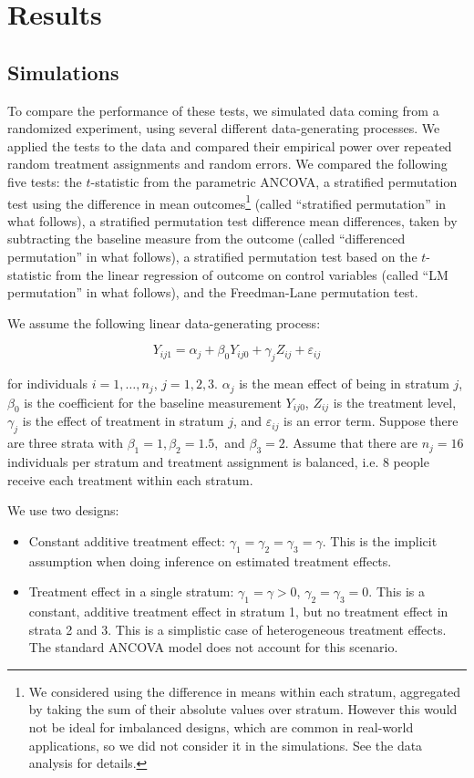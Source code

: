 \documentclass[11pt]{article}
\begin{document}
\section{Results}
\subsection{Simulations}

To compare the performance of these tests, we simulated data coming from a randomized experiment, using several different data-generating processes.
We applied the tests to the data and compared their empirical power over repeated random treatment assignments and random errors.
We compared the following five tests:
the $t$-statistic from the parametric ANCOVA,
a stratified permutation test using the difference in mean outcomes\footnote{ We considered using the difference in means within each stratum, aggregated by taking the sum of their absolute values over stratum. However this would not be ideal for imbalanced designs, which are common in real-world applications, so we did not consider it in the simulations.  See the data analysis for details.}
 (called ``stratified permutation'' in what follows),
a stratified permutation test difference mean differences, taken by subtracting the baseline measure from the outcome (called ``differenced permutation'' in what follows),
a stratified permutation test based on the $t$-statistic from the linear regression of outcome on control variables (called ``LM permutation'' in what follows),
and the Freedman-Lane permutation test.
 

We assume the following linear data-generating process:

\begin{equation}\label{eqn:dgp}
Y_{ij1} =\alpha_j + \beta_0Y_{ij0} + \gamma_j Z_{ij} + \varepsilon_{ij}
\end{equation}

\noindent for individuals $i = 1, \dots, n_j$, $j = 1, 2, 3$.
$\alpha_j$ is the mean effect of being in stratum $j$, 
$\beta_0$ is the coefficient for the baseline measurement $Y_{ij0}$, 
$Z_{ij}$ is the treatment level, 
$\gamma_j$ is the effect of treatment in stratum $j$, 
and $\varepsilon_{ij}$ is an error term.
Suppose there are three strata with $\beta_1 = 1, \beta_2 = 1.5,$ and $\beta_3 = 2$.
Assume that there are $n_j = 16$ individuals per stratum and treatment assignment is balanced, i.e. 8 people receive each treatment within each stratum.

We use two designs:
\begin{itemize}
\item Constant additive treatment effect: $\gamma_1 = \gamma_2 = \gamma_3 = \gamma$. This is the implicit assumption when doing inference on estimated treatment effects.
\item Treatment effect in a single stratum: $\gamma_1 = \gamma > 0$, $\gamma_2 = \gamma_3 = 0$. This is a constant, additive treatment effect in stratum 1, but no treatment effect in strata 2 and 3. This is a simplistic case of heterogeneous treatment effects. The standard ANCOVA model does not account for this scenario.
\end{itemize}
\end{document}
